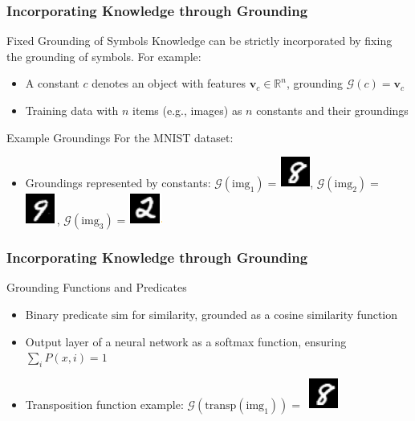 \documentclass{beamer}
\newcommand{\G}{\mathcal{G}}
\begin{document}
\begin{frame}
\frametitle{Incorporating Knowledge through Grounding}
\begin{block}{Fixed Grounding of Symbols}
Knowledge can be strictly incorporated by fixing the grounding of symbols. For example:
\begin{itemize}
    \item A constant \( c \) denotes an object with features \(
      \mathbf{v}_c \in \mathbb{R}^n \), grounding \( \G(c) =
      \mathbf{v}_c \)
    \item Training data with \( n \) items (e.g., images) as \( n \)
      constants and their groundings
\end{itemize}
\end{block}

\begin{block}{Example Groundings}
For the MNIST dataset:
\begin{itemize}
    \item Groundings represented by constants:
      $\G(\text{img}_1)=$\includegraphics[width=.03\textwidth]{8.png},
      $\G(\text{img}_2)=$\includegraphics[width=.03\textwidth]{9.png},
      $\G(\text{img}_3)=$\includegraphics[width=.03\textwidth]{2.png}
\end{itemize}
\end{block}
\end{frame}

\begin{frame}
\frametitle{Incorporating Knowledge through Grounding}
\begin{block}{Grounding Functions and Predicates}
\begin{itemize}
    \item Binary predicate \( \text{sim} \) for similarity, grounded
      as a cosine similarity function
    \item Output layer of a neural network as a softmax function,
      ensuring \( \sum_i P(x, i) = 1 \)
    \item Transposition function example: \(
      \G(\text{transp}(\text{img}_1)) = \)
      \includegraphics[width=.03\textwidth, angle=90]{8.png}
\end{itemize}
\end{block}
\end{frame}
\end{document}
